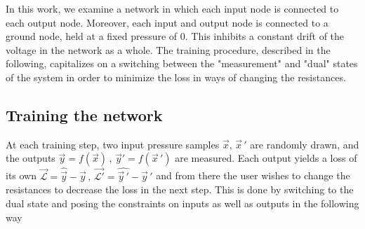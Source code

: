 \documentclass[%
 reprint,
 amsmath,amssymb,
 aps,
]{revtex4-2}
\begin{document}
{    In this work, we examine a network in which each input node is connected to each output node. Moreover, each input and output node is connected to a ground node, held at a fixed pressure of $0$. This inhibits a constant drift of the voltage in the network as a whole. 
    The training procedure, described in the following, capitalizes on a switching between the "measurement" and "dual" states of the system in order to minimize the loss in ways of changing the resistances.

\subsection{Training the network}\label{sec:training}

    At each training step, two input pressure samples $\vec{x},\,\vec{x}\,'$ are randomly drawn, and the outputs $\vec{y}=f\left(\vec{x}\right)\,,\,\vec{y}'=f\left(\vec{x}\,'\right)$ are measured. Each output yields a loss of its own $\vec{\mathcal{L}}=\widehat{\vec{y}}-\vec{y}\,,\,\vec{\mathcal{L}'}=\widehat{\vec{y}\,'}-\vec{y}\,'$ and from there the user wishes to change the resistances to decrease the loss in the next step. 
    This is done by switching to the dual state and posing the constraints on inputs as well as outputs in the following way


}
\end{document}
